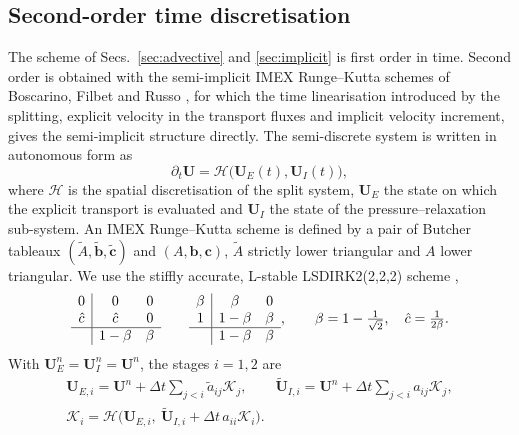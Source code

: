 \subsection{Second-order time discretisation}
\label{sec:time}
The scheme of Secs.~\ref{sec:advective} and \ref{sec:implicit} is first order in time. Second order is obtained with
the semi-implicit IMEX Runge--Kutta schemes of Boscarino, Filbet and Russo \cite{BoscarinoFilbetRusso2016}, for which the
time linearisation introduced by the splitting, explicit velocity in the transport fluxes and implicit velocity
increment, gives the semi-implicit structure directly. The semi-discrete system is written in autonomous form as
\begin{equation}
\partial_t\mathbf U=\mathcal H\big(\mathbf U_E(t),\mathbf U_I(t)\big),
\label{eq:autonomous}
\end{equation}
where $\mathcal H$ is the spatial discretisation of the split system, $\mathbf U_E$ the state on which the explicit transport
is evaluated and $\mathbf U_I$ the state of the pressure--relaxation sub-system. An IMEX Runge--Kutta scheme
\cite{Ascher1997,PareschiRusso2005} is defined by a pair of Butcher tableaux $(\tilde A,\tilde{\mathbf b},\tilde{\mathbf c})$ and
$(A,\mathbf b,\mathbf c)$, $\tilde A$ strictly lower triangular and $A$ lower triangular. We use the stiffly accurate, L-stable
LSDIRK2(2,2,2) scheme \cite{BoscarinoFilbetRusso2016,Avgerinos2019},
\begin{equation}
\begin{array}{c|cc}0&0&0\\ \hat c&\hat c&0\\\hline &1-\beta&\beta\end{array}\qquad
\begin{array}{c|cc}\beta&\beta&0\\ 1&1-\beta&\beta\\\hline &1-\beta&\beta\end{array},\qquad \beta=1-\tfrac1{\sqrt2},\quad \hat c=\tfrac1{2\beta}.
\label{eq:lsdirk}
\end{equation}
With $\mathbf U^n_E=\mathbf U^n_I=\mathbf U^n$, the stages $i=1,2$ are
\begin{equation}
\begin{gathered}
\mathbf U_{E,i}=\mathbf U^n+\Delta t\sum_{j<i}\tilde a_{ij}\mathcal K_j,\qquad \tilde{\mathbf U}_{I,i}=\mathbf U^n+\Delta t\sum_{j<i}a_{ij}\mathcal K_j,\\
\mathcal K_i=\mathcal H\big(\mathbf U_{E,i},\ \tilde{\mathbf U}_{I,i}+\Delta t\,a_{ii}\mathcal K_i\big).
\end{gathered}
\label{eq:stages}
\end{equation}
